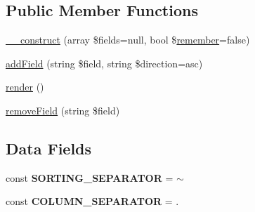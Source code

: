 \subsection*{Public Member Functions}
\begin{DoxyCompactItemize}
\item 
\hyperlink{classhamburgscleanest_1_1_data_tables_1_1_models_1_1_data_components_1_1_sorter_a0d814929f87d0f11eeadf759faf05fcb}{\+\_\+\+\_\+construct} (array \$fields=null, bool \$\hyperlink{classhamburgscleanest_1_1_data_tables_1_1_models_1_1_data_component_a565ac6563f3548952f5b3b9807799d17}{remember}=false)
\item 
\hyperlink{classhamburgscleanest_1_1_data_tables_1_1_models_1_1_data_components_1_1_sorter_aa5b9b656f19ab3777d6a2ad013c648fc}{add\+Field} (string \$field, string \$direction=\textquotesingle{}asc\textquotesingle{})
\item 
\hyperlink{classhamburgscleanest_1_1_data_tables_1_1_models_1_1_data_components_1_1_sorter_afde88292c44dc59faf017738dae6dffb}{render} ()
\item 
\hyperlink{classhamburgscleanest_1_1_data_tables_1_1_models_1_1_data_components_1_1_sorter_aa4c3f30fa02501d5020e400bef11a9bb}{remove\+Field} (string \$field)
\end{DoxyCompactItemize}
\subsection*{Data Fields}
\begin{DoxyCompactItemize}
\item 
\mbox{\label{classhamburgscleanest_1_1_data_tables_1_1_models_1_1_data_components_1_1_sorter_a087c53f1298172fcd6792a9e6d094786}} 
const {\bfseries S\+O\+R\+T\+I\+N\+G\+\_\+\+S\+E\+P\+A\+R\+A\+T\+OR} = \textquotesingle{}$\sim$\textquotesingle{}
\item 
\mbox{\label{classhamburgscleanest_1_1_data_tables_1_1_models_1_1_data_components_1_1_sorter_a3506ba6f9fa4c5bb1fa04da91367e6bd}} 
const {\bfseries C\+O\+L\+U\+M\+N\+\_\+\+S\+E\+P\+A\+R\+A\+T\+OR} = \textquotesingle{}.\textquotesingle{}
\end{DoxyCompactItemize}

